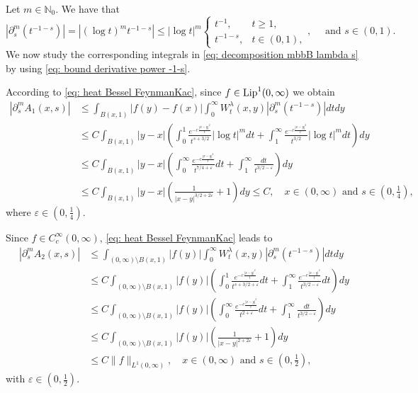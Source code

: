 \documentclass[a4paper,10pt, reqno]{amsart}
\theoremstyle{definition}
\theoremstyle{remark}
\numberwithin{equation}{section}
\begin{document}
Let $m\in \mathbb N_0$. We have that
\begin{equation}\label{eq: bound derivative power -1-s}
|\partial_s^m(t^{-1-s})|=|(\log t)^m t^{-1-s}|\leq |\log t|^m\left\{\begin{array}{ll}
t^{-1},&t\geq 1,\\
t^{-1-s},&t\in (0,1),
\end{array}
\right.,\quad \mbox{ and }s\in (0,1).
\end{equation}
We now study the corresponding integrals in \eqref{eq: decomposition mbbB lambda s} by using \eqref{eq: bound derivative power -1-s}.

 According to \eqref{eq: heat Bessel FeynmanKac}, since $f\in {\textup{Lip}}^1(0,\infty)$ we obtain
\begin{align}\label{eq: proof Thm1.1 first term}
    |\partial_s^mA_1(x,s)|&\leq \int_{B(x,1)}|f(y)-f(x)|\int_0^\infty W_t^\lambda (x,y) |\partial_s^m(t^{-1-s})|dtdy\nonumber\\
    &\leq C\int_{B(x,1)}|y-x|\left(\int_0^1\frac{e^{-c\frac{|x-y|^2}{t}}}{t^{s+3/2}}|\log t|^m dt+\int_1^\infty \frac{e^{-c\frac{|x-y|^2}{t}}}{t^{3/2}}|\log t|^m dt\right)dy\nonumber\\
    &\leq C\int_{B(x,1)}|y-x| \left(\int_0^\infty\frac{e^{-c\frac{|x-y|^2}{t}}}{t^{7 /4+\varepsilon }}dt+\int_1^\infty \frac{dt}{t^{3/2-\varepsilon}}\right)dy\nonumber\\
    &\leq C\int_{B(x,1)}|y-x|\left(\frac{1}{|x-y|^{3 /2+2\varepsilon}}+1\right)dy\leq C,\quad x\in (0,\infty)\mbox{ and }s\in \left(0,\tfrac{1}{4}\right),
\end{align}
where $\varepsilon \in (0,\tfrac14)$.

Since $f\in C_c^\infty(0,\infty)$, \eqref{eq: heat Bessel FeynmanKac} leads to
\begin{align}\label{eq: proof Thm1.1 second term}
    |\partial_s^mA_2(x,s)|&\leq \int_{(0,\infty) \setminus B(x,1)}|f(y)|\int_0^\infty W_t^\lambda (x,y) |\partial_s^m(t^{-1-s})|dtdy\nonumber\\
    &\leq C\int_{(0,\infty) \setminus B(x,1)}|f(y)|\left(\int_0^1\frac{e^{-c\frac{|x-y|^2}{t}}}{t^{s+3/2+\varepsilon }}dt+\int_1^\infty \frac{e^{-c\frac{|x-y|^2}{t}}}{t^{3/2-\varepsilon}}dt\right)dy\nonumber\\
    &\leq C\int_{(0,\infty) \setminus B(x,1)}|f(y)| \left(\int_0^\infty\frac{e^{-c\frac{|x-y|^2}{t}}}{t^{2+\varepsilon }}dt+\int_1^\infty \frac{dt}{t^{3/2-\varepsilon}}\right)dy\nonumber\\
    &\leq C\int_{(0,\infty) \setminus B(x,1)}|f(y)|\left(\frac{1}{|x-y|^{2+2\varepsilon}}+1\right)dy\nonumber\\
    &\leq C\|f\|_{L^1(0,\infty)},\quad x\in (0,\infty)\mbox{ and }s\in (0,\tfrac12),
\end{align}
with $\varepsilon \in (0,\tfrac12)$.
\end{document}

